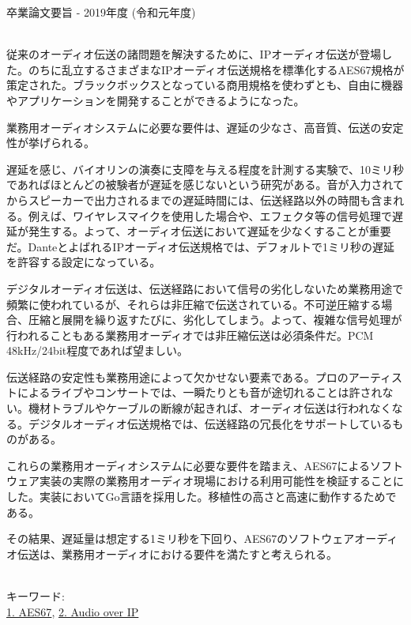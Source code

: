 卒業論文要旨 - 2019年度 (令和元年度)
\begin{center}
\begin{large}
\end{large}
\end{center}

~ \\

従来のオーディオ伝送の諸問題を解決するために、IPオーディオ伝送が登場した。のちに乱立するさまざまなIPオーディオ伝送規格を標準化するAES67規格が策定された。ブラックボックスとなっている商用規格を使わずとも、自由に機器やアプリケーションを開発することができるようになった。

業務用オーディオシステムに必要な要件は、遅延の少なさ、高音質、伝送の安定性が挙げられる。

遅延を感じ、バイオリンの演奏に支障を与える程度を計測する実験で、10ミリ秒であればほとんどの被験者が遅延を感じないという研究がある。音が入力されてからスピーカーで出力されるまでの遅延時間には、伝送経路以外の時間も含まれる。例えば、ワイヤレスマイクを使用した場合や、エフェクタ等の信号処理で遅延が発生する。よって、オーディオ伝送において遅延を少なくすることが重要だ。DanteとよばれるIPオーディオ伝送規格では、デフォルトで1ミリ秒の遅延を許容する設定になっている。

デジタルオーディオ伝送は、伝送経路において信号の劣化しないため業務用途で頻繁に使われているが、それらは非圧縮で伝送されている。不可逆圧縮する場合、圧縮と展開を繰り返すたびに、劣化してしまう。よって、複雑な信号処理が行われることもある業務用オーディオでは非圧縮伝送は必須条件だ。PCM 48kHz/24bit程度であれば望ましい。

伝送経路の安定性も業務用途によって欠かせない要素である。プロのアーティストによるライブやコンサートでは、一瞬たりとも音が途切れることは許されない。機材トラブルやケーブルの断線が起きれば、オーディオ伝送は行われなくなる。デジタルオーディオ伝送規格では、伝送経路の冗長化をサポートしているものがある。

これらの業務用オーディオシステムに必要な要件を踏まえ、AES67によるソフトウェア実装の実際の業務用オーディオ現場における利用可能性を検証することにした。実装においてGo言語を採用した。移植性の高さと高速に動作するためである。

その結果、遅延量は想定する1ミリ秒を下回り、AES67のソフトウェアオーディオ伝送は、業務用オーディオにおける要件を満たすと考えられる。

~ \\
キーワード:\\
\underline{1. AES67},
\underline{2. Audio over IP}
\begin{flushright}
\dept \\
\author
\end{flushright}
